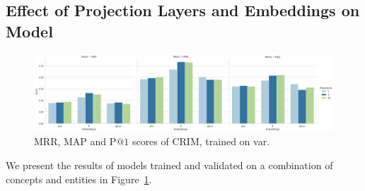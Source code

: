 \subsection{Effect of Projection Layers and Embeddings on Model}
\begin{figure}[ht!] 
  \centering
  \includegraphics[width=1.\linewidth]{images/semeval_crim_proj_embed.png}
  \caption{\ac{MRR}, \ac{MAP} and P$@1$ scores of CRIM, trained on var.}
  \label{fig:semeval_crim_proj_embed}
\end{figure}
We present the results of models trained and validated on a combination of concepts and entities in Figure~\ref{fig:semeval_crim_proj_embed}.  











